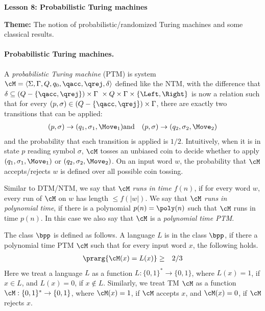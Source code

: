 \documentclass[11pt, a4paper]{article}
\renewcommand{\lesson}{8}
\renewcommand{\lessontitle}{Probabilistic Turing machines}
\renewcommand{\fulltitle}{Lesson \lesson: \lessontitle}
\begin{document}
\date{}



\begin{center}
{\Large {\bf \fulltitle}}
\end{center}
\vspace{0.5cm}

\noindent
{\bf Theme:} The notion of probabilistic/randomized Turing machines and some classical results.

\paragraph*{Probabilistic Turing machines.}
A {\em probabilistic Turing machine} (PTM) is system $\cM = \langle \Sigma,\Gamma,Q,q_0,\qacc,\qrej,\delta\rangle$
defined like the NTM,
with the difference that $\delta\subseteq (Q-\{\qacc,\qrej\})\times\Gamma \ \times Q\times \Gamma\times \{\Left,\Right\}$ 
is now a relation such that for every $(p,\sigma)\in (Q-\{\qacc,\qrej\})\times\Gamma$,
there are exactly two transitions that can be applied:
\begin{eqnarray*}
(p,\sigma)\to (q_1,\sigma_1,\Move_1) & \text{and} &
(p,\sigma)\to (q_2,\sigma_2,\Move_2)
\end{eqnarray*}
and the probability that each transition is applied is $1/2$.
Intuitively, when it is in state $p$ reading symbol $\sigma$,
$\cM$ tosses an unbiased coin to decide whether to apply $(q_1,\sigma_1,\Move_1)$ or $(q_2,\sigma_2,\Move_2)$.
On an input word $w$, the probability that $\cM$ accepts/rejects $w$ is defined
over all possible coin tossing.

Similar to DTM/NTM, we say that {\em $\cM$ runs in time $f(n)$}, if
for every word $w$, every run of $\cM$ on $w$ has length $\leq f(|w|)$.
We say that {\em $\cM$ runs in polynomial time}, if there is a polynomial $p(n)=\poly(n)$
such that $\cM$ runs in time $p(n)$.
In this case we also say that $\cM$ is a {\em polynomial time PTM}.

The class $\bpp$ is defined as follows.
A language $L$ is in the class $\bpp$, if there a polynomial time PTM $\cM$ such that
for every input word $x$, the following holds.
\begin{eqnarray*}
\prarg { \cM(x) = L(x) } & \geq & 2/3
\end{eqnarray*}
Here we treat a language $L$ as a function $L:\{0,1\}^*\to \{0,1\}$,
where $L(x)=1$, if $x\in L$,
and $L(x)=0$, if $x\notin L$. 
Similarly, we treat TM $\cM$ as a function $\cM:\{0,1\}^*\to \{0,1\}$,
where $\cM(x)=1$, if $\cM$ accepts $x$,
and $\cM(x)=0$, if $\cM$ rejects $x$.
\end{document}
